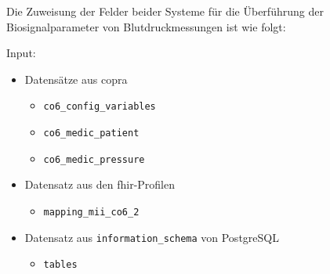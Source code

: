 Die Zuweisung der Felder beider Systeme für die Überführung der Biosignalparameter von Blutdruckmessungen ist wie folgt:
\vspace{4mm}

\noindent Input:
\begin{itemize}
	\item Datensätze aus \ac{copra}
	\begin{itemize}
		\item \texttt{co6\_config\_variables}
		\item \texttt{co6\_medic\_patient}
		\item \texttt{co6\_medic\_pressure} 
	\end{itemize}
	\item Datensatz aus den \ac{fhir}-Profilen
	\begin{itemize}
		\item \texttt{mapping\_mii\_co6\_2}
	\end{itemize}
	\item Datensatz aus \texttt{information\_schema} von PostgreSQL
	\begin{itemize}
		\item \texttt{tables}
	\end{itemize}
\end{itemize}

